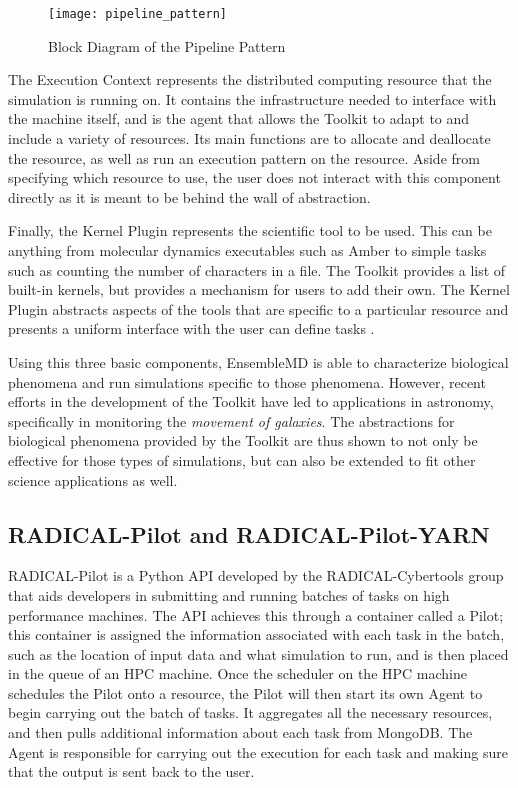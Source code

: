 \documentclass[]{article}
\begin{document}
		\begin{figure}[H]
			\centering
			\texttt{[image: pipeline\_pattern]}
			\caption{Block Diagram of the Pipeline Pattern \cite{pipeline_pattern}}
			\label{fig:pipeline_block_diagram}
		\end{figure}

		The Execution Context represents the distributed computing resource that the simulation is running on. It contains the infrastructure needed to interface with the machine itself, and is the agent that allows the Toolkit to adapt to and include a variety of resources. Its main functions are to allocate and deallocate the resource, as well as run an execution pattern on the resource. Aside from specifying which resource to use, the user does not interact with this component directly as it is meant to be behind the wall of abstraction. 

		Finally, the Kernel Plugin represents the scientific tool to be used. This can be anything from molecular dynamics executables such as Amber to simple tasks such as counting the number of characters in a file. The Toolkit provides a list of built-in kernels, but provides a mechanism for users to add their own. The Kernel Plugin abstracts aspects of the tools that are specific to a particular resource and presents a uniform interface with the user can define tasks \cite{enmd_paper}.

		Using this three basic components, EnsembleMD is able to characterize biological phenomena and run simulations specific to those phenomena. However, recent efforts in the development of the Toolkit have led to applications in astronomy, specifically in monitoring the \textit{movement of galaxies}. The abstractions for biological phenomena provided by the Toolkit are thus shown to not only be effective for those types of simulations, but can also be extended to fit other science applications as well.

	\subsection{RADICAL-Pilot and RADICAL-Pilot-YARN}
		RADICAL-Pilot is a Python API developed by the RADICAL-Cybertools group that aids developers in submitting and running batches of tasks on high performance machines. The API achieves this through a container called a Pilot; this container is assigned the information associated with each task in the batch, such as the location of input data and what simulation to run, and is then placed in the queue of an HPC machine. Once the scheduler on the HPC machine schedules the Pilot onto a resource, the Pilot will then start its own Agent to begin carrying out the batch of tasks. It aggregates all the necessary resources, and then pulls additional information about each task from MongoDB. The Agent is responsible for carrying out the execution for each task and making sure that the output is sent back to the user.
\end{document}

